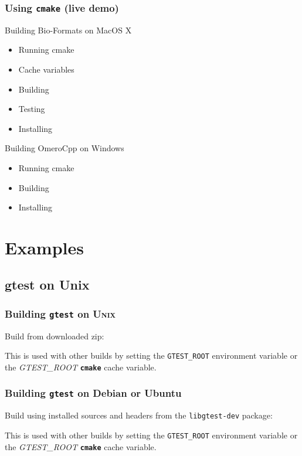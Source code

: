 \documentclass{beamer}
\newcommand{\cmd}[1]{\textbf{\texttt{#1}}}
\newcommand{\pkg}[1]{\texttt{#1}}
\newcommand{\env}[1]{\texttt{#1}}
\newcommand{\opt}[1]{\textsl{#1}}
\begin{document}
\begin{frame}
  \frametitle{Using \cmd{cmake} (live demo)}
  \begin{block}{Building Bio-Formats on MacOS X}
    \begin{itemize}
      \item Running cmake
      \item Cache variables
      \item Building
      \item Testing
      \item Installing
    \end{itemize}
  \end{block}
  \begin{block}{Building OmeroCpp on Windows}
    \begin{itemize}
      \item Running cmake
      \item Building
      \item Installing
    \end{itemize}
  \end{block}
\end{frame}

\section{Examples}
\subsection{gtest on Unix}

\begin{frame}[fragile]
  \frametitle{Building \pkg{gtest} on U\textsc{nix}}
  Build from downloaded zip:

  \begin{semiverbatim}
\end{semiverbatim}

This is used with other builds by setting the \env{GTEST\_ROOT}
environment variable or the \opt{GTEST\_ROOT} \cmd{cmake} cache
variable.

\end{frame}

\begin{frame}[fragile]
  \frametitle{Building \pkg{gtest} on Debian or Ubuntu}
  Build using installed sources and headers from the \pkg{libgtest-dev} package:

  \begin{semiverbatim}
\end{semiverbatim}

This is used with other builds by setting the \env{GTEST\_ROOT}
environment variable or the \opt{GTEST\_ROOT} \cmd{cmake} cache
variable.
\end{frame}
\end{document}
